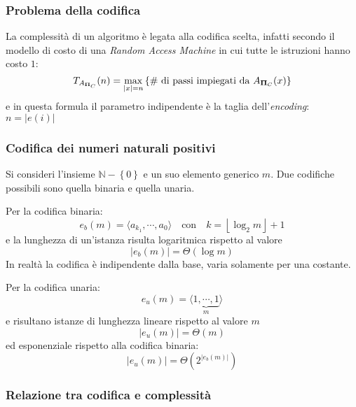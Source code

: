\subsubsection{Problema della codifica}
La complessità di un algoritmo è legata alla codifica scelta, infatti secondo il modello di costo di una \emph{Random Access Machine} in cui tutte le istruzioni hanno costo $1$:
\begin{equation}
    T_{A_{\bm{\Pi}{}_{C}}} (n) = \max_{|x|=n} \left\{ \text{\# di passi impiegati da } A_{\bm{\Pi}{}_{C}} (x) \right\}
    \label{eq:compltaglia}
\end{equation}
e in questa formula il parametro indipendente è la taglia dell'\emph{encoding}: $n=|e(i)|$

\subsubsection{Codifica dei numeri naturali positivi}
Si consideri l'insieme $\mathbb{N} - \left\{ 0 \right\}$ e un suo elemento generico $m$. Due codifiche possibili sono quella binaria e quella unaria.

Per la codifica binaria:
\begin{equation*}
    e_b (m) = \langle a_{k_1}, \cdots, a_0  \rangle \quad \text{con} \quad k = \left\lfloor \log_2 m \right\rfloor + 1
\end{equation*}
e la lunghezza di un'istanza risulta logaritmica rispetto al valore
\begin{equation*}
    |e_b(m)| = \Theta \left( \log m \right)
\end{equation*}
In realtà la codifica è indipendente dalla base, varia solamente per una costante.

Per la codifica unaria:
\begin{equation*}
    e_u (m) = \langle  \underbrace{1, \cdots, 1}_m  \rangle
\end{equation*}
e risultano istanze di lunghezza lineare rispetto al valore $m$
\begin{equation}
    |e_u(m)| = \Theta \left( m \right)
    \label{eq:coduncomp}
\end{equation}
ed esponenziale rispetto alla codifica binaria:
\begin{equation*}
    |e_u(m)| = \Theta \left( 2^{|e_b(m)|} \right)
\end{equation*}

\subsubsection{Relazione tra codifica e complessità}

